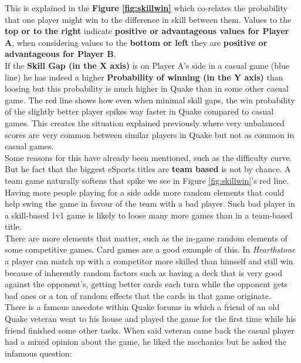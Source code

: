 This is explained in the \textbf{Figure \ref{fig:skillwin}} which co-relates the probability that one player might win to the difference in skill between them. Values to the \textbf{top or to the right} indicate \textbf{positive or advantageous values for Player A}, when considering values to the \textbf{bottom or left} they are \textbf{positive or advantageous for Player B}.\\

If the \textbf{Skill Gap (in the X axis)} is on Player A's side in a casual game (blue line) he has indeed a higher \textbf{Probability of winning (in the Y axis)} than loosing but this probability is much higher in Quake than in some other casual game. The red line shows how even when minimal skill gaps, the win probability of the slightly better player spikes way faster in Quake compared to casual games. This creates the situation explained previously where very unbalanced scores are very common between similar players in Quake but not as common in casual games.\\

Some reasons for this have already been mentioned, such as the difficulty curve. But he fact that the biggest eSports titles are \textbf{team based} is not by chance. A team game naturally softens that spike we see in Figure \ref{fig:skillwin}'s red line. Having more people playing for a side adds more random elements that could help swing the game in favour of the team with a bad player. Such bad player in a skill-based 1v1 game is likely to loose many more games than in a team-based title.\\

There are more elements that matter, such as the in-game random elements of some competitive games. Card games are a good example of this. In \textit{Hearthstone} \citep{game:hs} a player can match up with a competitor more skilled than himself and still win because of inherently random factors such as having a deck that is very good against the opponent's, getting better cards each turn while the opponent gets bad ones or a ton of random effects that the cards in that game originate.\\

There is a famous anecdote within Quake forums in which a friend of an old Quake veteran went to his house and played the game for the first time while his friend finished some other tasks. When said veteran came back the casual player had a mixed opinion about the game, he liked the mechanics but he asked the infamous question:

